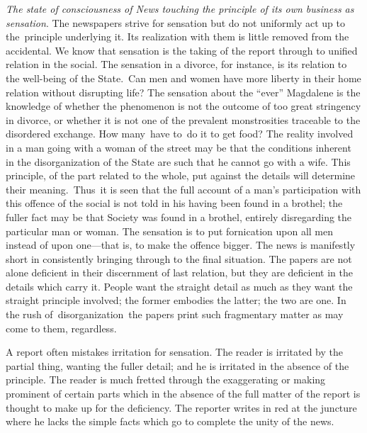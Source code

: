 \documentclass[twoside,symmetric,nobib,justified]{tufte-book}
\begin{document}
\vspace{0.05in}

\emph{The state of consciousness of News touching the principle of its
own business as sensation}. The newspapers strive for sensation but do
not uniformly act up to the~principle underlying it. Its realization
with them is little removed from the accidental. We know that sensation
is the taking of the report through to unified relation in the social.
The sensation in a divorce, for instance, is its relation to the
well-being of the State.~Can men and women have more liberty in their
home relation without disrupting life? The sensation about the ``ever''
Magdalene is the knowledge of whether the phenomenon is not the outcome
of too great stringency in divorce, or whether it is not one of the
prevalent monstrosities traceable to the disordered exchange. How
many~have to~do it to get food? The reality involved in a man going with
a woman of the street may be that the conditions inherent in the
disorganization of the State are such that he cannot go with a wife.
This principle, of the part related to the whole, put against the
details will determine their meaning.~Thus~it is seen that the full
account of a man's participation with this offence of the social is not
told in his having been found in a brothel; the fuller fact may be that
Society was found in a brothel, entirely disregarding the particular man
or woman. The sensation is to put fornication upon all men instead of
upon one---that is, to make the offence bigger. The news is manifestly
short in consistently bringing through to the final situation. The
papers are not alone deficient in their discernment of last relation,
but they are deficient in the details which carry it. People want the
straight detail as much as they want the straight principle involved;
the former embodies the latter; the two are one. In the rush
of~disorganization~the papers print such fragmentary matter as may come
to them, regardless.~

A report often mistakes irritation for sensation. The reader is
irritated by the partial thing, wanting the fuller detail; and he is
irritated in the absence of the principle. The reader is much fretted
through the exaggerating or making prominent of certain parts which in
the absence of the full matter of the report is thought to make up for
the deficiency. The reporter writes in red at the juncture where he
lacks the simple facts which go to complete the unity of the news.~
\end{document}
